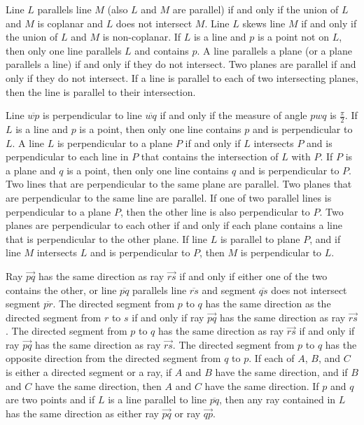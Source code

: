 \documentclass{article}
\begin{document}
Line $L$ parallels line $M$ (also $L$ and $M$ are parallel) if and only if the union of $L$ and $M$ is coplanar and $L$ does not intersect $M$. Line $L$ skews line $M$ if and only if the union of $L$ and $M$ is non-coplanar. If $L$ is a line and $p$ is a point not on $L$, then only one line parallels $L$ and contains $p$. A line parallels a plane (or a plane parallels a line) if and only if they do not intersect. Two planes are parallel if and only if they do not intersect. If a line is parallel to each of two intersecting planes, then the line is parallel to their intersection.

Line $\overline{w p}$ is perpendicular to line $\overline{w q}$ if and only if the measure of angle $p w q$ is $\frac{\pi}{2}$. If $L$ is a line and $p$ is a point, then only one line contains $p$ and is perpendicular to $L$. A line $L$ is perpendicular to a plane $P$ if and only if $L$ intersects $P$ and is perpendicular to each line in $P$ that contains the intersection of $L$ with $P$. If $P$ is a plane and $q$ is a point, then only one line contains $q$ and is perpendicular to $P$. Two lines that are perpendicular to the same plane are parallel. Two planes that are perpendicular to the same line are parallel. If one of two parallel lines is perpendicular to a plane $P$, then the other line is also perpendicular to $P$. Two planes are perpendicular to each other if and only if each plane contains a line that is perpendicular to the other plane. If line $L$ is parallel to plane $P$, and if line $M$ intersects $L$ and is perpendicular to $P$, then $M$ is perpendicular to $L$.

Ray $\overrightarrow{p q}$ has the same direction as ray $\overrightarrow{r s}$ if and only if either one of the two contains the other, or line $\overline{p q}$ parallels line $\overline{r s}$ and segment $\overline{q s}$ does not intersect segment $\overline{p r}$. The directed segment from $p$ to $q$ has the same direction as the directed segment from $r$ to $s$ if and only if ray $\overrightarrow{p q}$ has the same direction as ray $\overrightarrow{r s}$. The directed segment from $p$ to $q$ has the same direction as ray $\overrightarrow{r s}$ if and only if ray $\overrightarrow{p q}$ has the same direction as ray $\overrightarrow{r s}$. The directed segment from $p$ to $q$ has the opposite direction from the directed segment from $q$ to $p$. If each of $A$, $B$, and $C$ is either a directed segment or a ray, if $A$ and $B$ have the same direction, and if $B$ and $C$ have the same direction, then $A$ and $C$ have the same direction. If $p$ and $q$ are two points and if $L$ is a line parallel to line $\overline{p q}$, then any ray contained in $L$ has the same direction as either ray $\overrightarrow{p q}$ or ray $\overrightarrow{q p}$.
\end{document}
